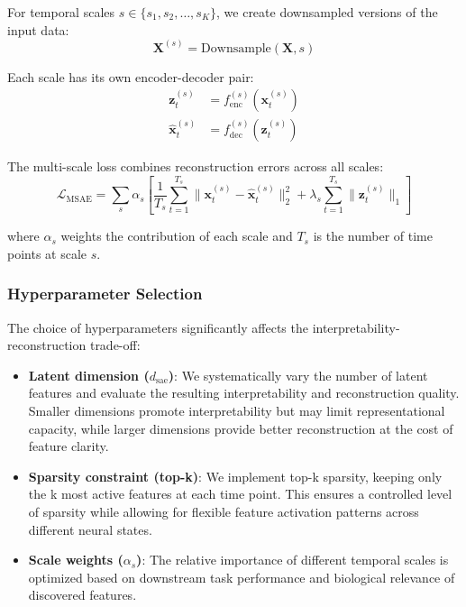 For temporal scales $s \in \{s_1, s_2, \ldots, s_K\}$, we create downsampled versions of the input data:
\begin{equation}
\mathbf{X}^{(s)} = \text{Downsample}(\mathbf{X}, s)
\end{equation}

Each scale has its own encoder-decoder pair:
\begin{align}
\mathbf{z}_t^{(s)} &= f_{\text{enc}}^{(s)}(\mathbf{x}_t^{(s)}) \\
\hat{\mathbf{x}}_t^{(s)} &= f_{\text{dec}}^{(s)}(\mathbf{z}_t^{(s)})
\end{align}

The multi-scale loss combines reconstruction errors across all scales:
\begin{equation}
\mathcal{L}_{\text{MSAE}} = \sum_{s} \alpha_s \left[ \frac{1}{T_s} \sum_{t=1}^{T_s} \|\mathbf{x}_t^{(s)} - \hat{\mathbf{x}}_t^{(s)}\|_2^2 + \lambda_s \sum_{t=1}^{T_s} \|\mathbf{z}_t^{(s)}\|_1 \right]
\end{equation}

where $\alpha_s$ weights the contribution of each scale and $T_s$ is the number of time points at scale $s$.

\subsubsection{Hyperparameter Selection}

The choice of hyperparameters significantly affects the interpretability-reconstruction trade-off:

\begin{itemize}
\item \textbf{Latent dimension ($d_{\text{sae}}$)}: We systematically vary the number of latent features and evaluate the resulting interpretability and reconstruction quality. Smaller dimensions promote interpretability but may limit representational capacity, while larger dimensions provide better reconstruction at the cost of feature clarity.

\item \textbf{Sparsity constraint (top-k)}: We implement top-k sparsity, keeping only the k most active features at each time point. This ensures a controlled level of sparsity while allowing for flexible feature activation patterns across different neural states.

\item \textbf{Scale weights ($\alpha_s$)}: The relative importance of different temporal scales is optimized based on downstream task performance and biological relevance of discovered features.
\end{itemize}
